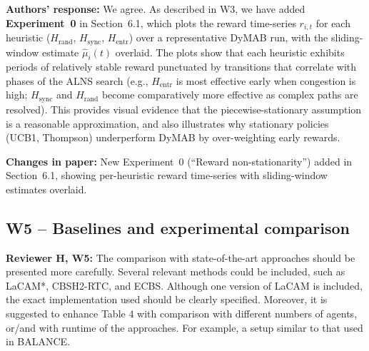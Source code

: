 \documentclass[review]{jair}
\begin{document}
\begin{authorbox}
\textbf{Authors' response:} We agree. As described in W3, we have added \textbf{Experiment~0} in Section~6.1, which plots the reward time-series $r_{i,t}$ for each heuristic ($H_{\text{rand}}$, $H_{\text{sync}}$, $H_{\text{entr}}$) over a representative DyMAB run, with the sliding-window estimate $\hat{\mu}_i(t)$ overlaid. The plots show that each heuristic exhibits periods of relatively stable reward punctuated by transitions that correlate with phases of the ALNS search (e.g., $H_{\text{entr}}$ is most effective early when congestion is high; $H_{\text{sync}}$ and $H_{\text{rand}}$ become comparatively more effective as complex paths are resolved). This provides visual evidence that the piecewise-stationary assumption is a reasonable approximation, and also illustrates why stationary policies (UCB1, Thompson) underperform DyMAB by over-weighting early rewards.
\end{authorbox}

\begin{changebox}
\textbf{Changes in paper:} New Experiment~0 (``Reward non-stationarity'') added in Section~6.1, showing per-heuristic reward time-series with sliding-window estimates overlaid.
\end{changebox}

\subsection*{W5 -- Baselines and experimental comparison}

\begin{reviewerbox}
\textbf{Reviewer H, W5:} The comparison with state-of-the-art approaches should be presented more carefully. Several relevant methods could be included, such as LaCAM*, CBSH2-RTC, and ECBS. Although one version of LaCAM is included, the exact implementation used should be clearly specified. Moreover, it is suggested to enhance Table 4 with comparison with different numbers of agents, or/and with runtime of the approaches. For example, a setup similar to that used in BALANCE.
\end{reviewerbox}
\end{document}
